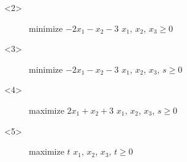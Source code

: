 \documentclass[aspectratio = 169]{beamer}
\begin{document}
\begin{frame}
\begin{columns}
\begin{column}{.55\textwidth}
\begin{overlayarea}{\textwidth}{.55\textheight}
        \begin{onlyenv}<2>
         ~
          \begin{figure}
            \begin{linearProg}{
                minimize
              }{
                $-2x_1 - x_2 - 3$
              }{
              }{
                $x_1$, $x_2$, $x_3 \geq 0$
              }
            \end{linearProg}
          \end{figure}
        \end{onlyenv}
        \begin{onlyenv}<3>
          \begin{figure}
            \begin{linearProg}{
                minimize
              }{
                $-2x_1 - x_2 - 3$
              }{
              }{
                $x_1$, $x_2$, $x_3$, $s \geq 0$
              }
            \end{linearProg}
          \end{figure}
        \end{onlyenv}
        \begin{onlyenv}<4>
          \begin{figure}
            \begin{linearProg}{
                maximize
              }{
                $2x_1 + x_2 + 3$
              }{
              }{
                $x_1$, $x_2$, $x_3$, $s \geq 0$
              }
            \end{linearProg}
          \end{figure}
        \end{onlyenv}
        \begin{onlyenv}<5>
          \begin{figure}
            \begin{linearProg}{
                maximize
              }{
                $t$
              }{
              }{
                $x_1$, $x_2$, $x_3$, $t \geq 0$
              }
            \end{linearProg}
          \end{figure}
        \end{onlyenv}
      \end{overlayarea}
    \end{column}
  \end{columns}
\end{frame}
\end{document}
